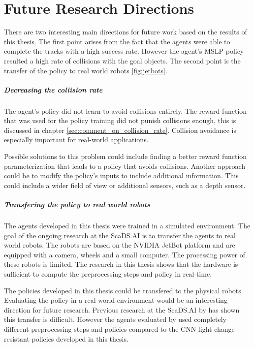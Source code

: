 \chapter{Future Research Directions}
\label{cha:futur_research_directions}

There are two interesting main directions for future work based on the results of this thesis. The first point arises from the fact that the agents were able to complete the tracks with a high success rate. However the agent's \acs{MSLP} policy resulted a high rate of collisions with the goal objects. The second point is the transfer of the policy to real world robots \ref{fig:jetbots}.


\paragraph{Decreasing the collision rate}

The agent's policy did not learn to avoid collisions entirely. The reward function that was used for the policy training did not punish collisions enough, this is discussed in chapter \ref{sec:comment_on_collision_rate}. Collision avoidance is especially important for real-world applications.

Possible solutions to this problem could include finding a better reward function parameterization that leads to a policy that avoids collisions. Another approach could be to modify the policy's inputs to include additional information. This could include a wider field of view or additional sensors, such as a depth sensor.

\paragraph{Transfering the policy to real world robots}

The agents developed in this thesis were trained in a simulated environment. The goal of the ongoing research at the ScaDS.AI is to transfer the agents to real world robots. The robots are based on the NVIDIA JetBot platform and are equipped with a camera, wheels and a small computer. The processing power of these robots is limited. The research in this thesis shows that the hardware is sufficient to compute the preprocessing steps and policy in real-time.

The policies developed in this thesis could be transfered to the physical robots. Evaluating the policy in a real-world environment would be an interesting direction for future research. Previous research at the ScaDS.AI by \textcite{merlin_flach} has shown this transfer is difficult. However the agents evaluated by \textcite{merlin_flach} used completely different preprocessing steps and policies compared to the \acs{CNN} light-change resistant policies developed in this thesis. 




